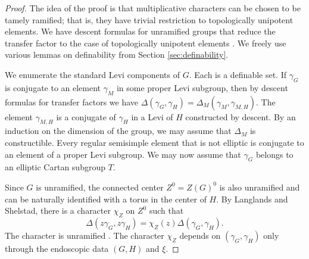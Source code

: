 \begin{proof}  
  The idea of the proof is that
  multiplicative characters can be chosen to be tamely ramified; that
  is, they have trivial restriction to topologically unipotent
  elements.  We have descent formulas for unramified groups that
  reduce the transfer factor to the case of topologically unipotent
  elements \cite{langlands2007descent} \cite{hales1993simple}
  \cite{langlands2007descent}.
  We freely use various lemmas on definability from Section
  \ref{sec:definability}.

  We enumerate the standard Levi components of $G$.  Each is a
  definable set.  If $\gamma_G$ is conjugate to an element $\gamma_M$
  in some proper Levi subgroup, then by descent formulas for transfer
  factors we have $\Delta(\gamma_G,\gamma_H) =
  \Delta_M(\gamma_M,\gamma_{M,H})$.  The element $\gamma_{M,H}$ is a
  conjugate of $\gamma_H$ in a Levi of $H$ constructed by descent.  By
  an induction on the dimension of the group, we may assume that
  $\Delta_M$ is constructible.  Every regular semisimple element that
  is not elliptic is conjugate to an element of a proper Levi subgroup.  We may now
  assume that $\gamma_G$ belongs to an elliptic Cartan subgroup $T$.

  Since $G$ is unramified, the connected center $Z^0 = Z(G)^0$ is also
  unramified and can be naturally identified with a torus in the
  center of $H$.  By Langlands and Shelstad, there is a character
  $\chi_Z$ on $Z^0$ such that
\[
\Delta(z\gamma_G,z\gamma_H) = \chi_Z(z)\Delta(\gamma_G,\gamma_H).
\]
The character is unramified \cite{hales1993simple}.  The character
$\chi_Z$ depends on $(\gamma_G,\gamma_H)$ only through the endoscopic
data $(G,H)$ and $\xi$.  





\end{proof}
